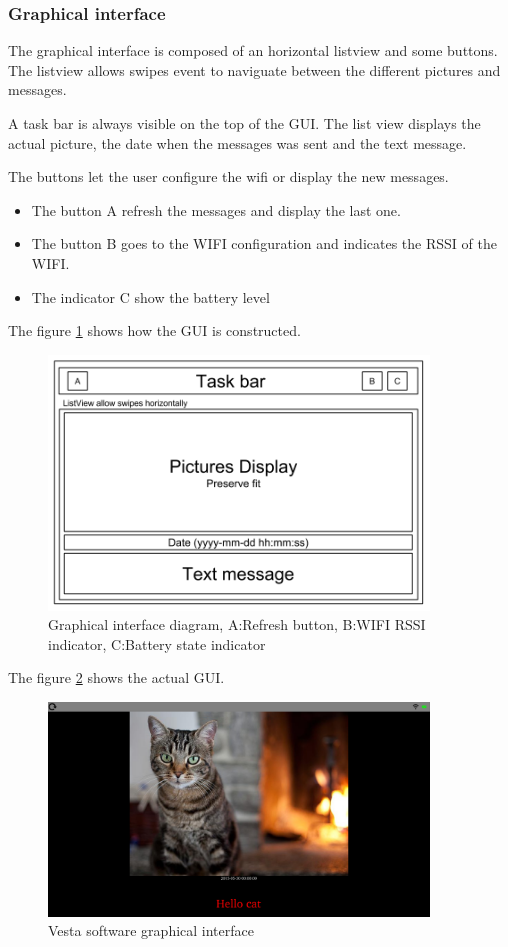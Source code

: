 \subsubsection{Graphical interface}
The graphical interface is composed of an horizontal listview and some buttons. The listview allows swipes event to naviguate between the different pictures and messages.

A task bar is always visible on the top of the GUI. The list view displays the actual picture, the date when the messages was sent and the text message.

The buttons let the user configure the wifi or display the new messages.

\begin{itemize}
\item{The button A refresh the messages and display the last one.}
\item{The button B goes to the WIFI configuration and indicates the RSSI of the WIFI.}
\item{The indicator C show the battery level}
\end{itemize}

The figure \ref{fig:gui diagram} shows how the GUI is constructed.

\begin{figure}[!htb]
    \centering
    \includegraphics[width=0.9\textwidth,keepaspectratio]{chap/softFig/GUI_diagram}
    \caption{Graphical interface diagram, A:Refresh button, B:WIFI RSSI indicator, C:Battery state indicator}
    \label{fig:gui diagram}
\end{figure}

The figure \ref{fig:graphical interface} shows the actual GUI.

\begin{figure}[!htb]
    \centering
    \includegraphics[width=0.9\textwidth,keepaspectratio]{chap/softFig/vesta_printscreen}
    \caption{Vesta software graphical interface}
    \label{fig:graphical interface}
\end{figure}


